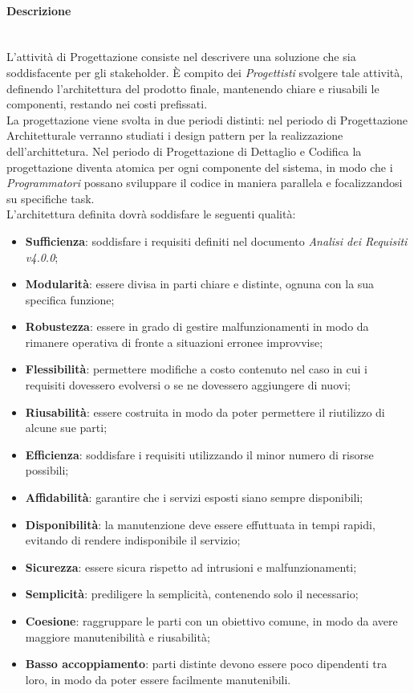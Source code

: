 \paragraph{Descrizione}
\label{Progettazione_Scopo} \-\\
L'attività di Progettazione consiste nel descrivere una soluzione che sia soddisfacente per gli stakeholder\glossario. È compito dei \textit{Progettisti} svolgere tale attività, definendo l'architettura del prodotto finale, mantenendo chiare e riusabili le componenti, restando nei costi prefissati.\\
La progettazione viene svolta in due periodi distinti: nel periodo di Progettazione Architetturale verranno studiati i design pattern per la realizzazione dell'archittetura. Nel periodo di  Progettazione di Dettaglio e Codifica la progettazione diventa atomica per ogni componente del sistema, in modo che i \textit{Programmatori} possano sviluppare il codice in maniera parallela e focalizzandosi su specifiche task. \\
L’architettura definita dovrà soddisfare le seguenti qualità:
\begin{itemize}
	\item \textbf{Sufficienza}: soddisfare i requisiti definiti nel documento \textit{Analisi dei Requisiti v4.0.0};
	\item \textbf{Modularità}: essere divisa in parti chiare e distinte, ognuna con la sua specifica funzione;
	\item \textbf{Robustezza}: essere in grado di gestire malfunzionamenti in modo da
	rimanere operativa di fronte a situazioni erronee improvvise;
	\item \textbf{Flessibilità}: permettere modifiche a costo contenuto nel caso in cui i
	requisiti dovessero evolversi o se ne dovessero aggiungere di nuovi;
	\item \textbf{Riusabilità}: essere costruita in modo da poter permettere il riutilizzo
	di alcune sue parti;
	\item \textbf{Efficienza}: soddisfare i requisiti utilizzando il minor numero di risorse possibili;
	\item \textbf{Affidabilità}: garantire che i servizi esposti siano sempre disponibili;
	\item \textbf{Disponibilità}: la manutenzione deve essere effuttuata in tempi rapidi, evitando di rendere indisponibile il servizio;
	\item \textbf{Sicurezza}: essere sicura rispetto ad intrusioni e malfunzionamenti;
	\item \textbf{Semplicità}: prediligere la semplicità, contenendo solo il necessario;
	\item \textbf{Coesione}: raggruppare le parti con un obiettivo comune, in modo da avere maggiore manutenibilità e riusabilità;
	\item \textbf{Basso accoppiamento}: parti distinte devono essere poco dipendenti tra loro, in modo da poter essere facilmente manutenibili.
\end{itemize}

